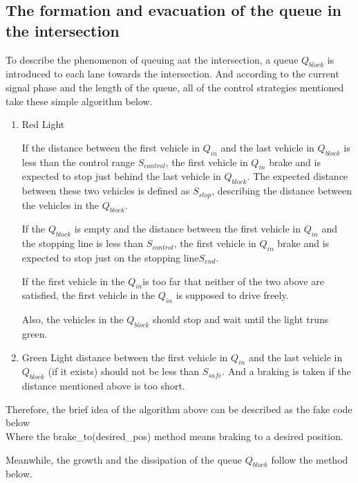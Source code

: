 \documentclass[a4paper]{paper}
\begin{document}
\subsection{The formation and evacuation of the queue in the intersection}
\label{section:feq}
To describe the phenomenon of queuing aat the intersection, a queue $Q_{block}$ is introduced to each lane towards the intersection. And according to the current signal phase and the length of the queue, all of the control strategies mentioned take these simple algorithm below.
\begin{enumerate}
\item Red Light

If the distance between the first vehicle in $Q_{in}$ and the last vehicle in $Q_{block}$ is less than the control range $S_{control}$, the first vehicle in $Q_{in}$ brake and is expected to stop just behind the last vehicle in $Q_{block}$. The expected distance between these two vehicles is defined as $S_{stop}$, describing the distance between the vehicles in the $Q_{block}$. 

If the $Q_{block}$ is empty and the distance between the first vehicle in $Q_{in}$ and the stopping line is less than $S_{control}$, the first vehicle in $Q_{in}$ brake and is expected to stop just on the stopping line$S_{end}$.

If the first vehicle in the $Q_{in}$is too far that neither of the two above are satisfied, the first vehicle in the $Q_{in}$ is supposed to drive freely.

Also, the vehicles in the $Q_{block}$ should stop and wait until the light truns green.
\item Green Light
distance between the first vehicle in $Q_{in}$ and the last vehicle in $Q_{block}$ (if it exists) should not be less than $S_{safe}$. And a braking is taken if the distance mentioned above is too short.
\end{enumerate}
Therefore, the brief idea of the algorithm above can be described as the fake code below\\ 



Where the brake\_to(desired\_pos) method means braking to a desired position.

Meanwhile, the growth and the dissipation of the queue $Q_{block}$ follow the method below.
\end{document}
